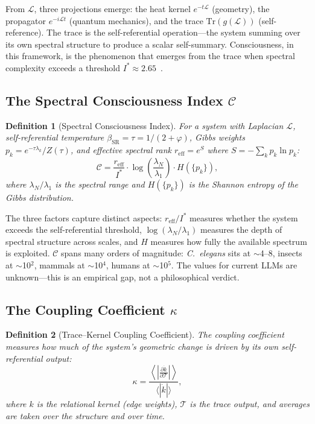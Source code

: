 \documentclass[11pt,letterpaper]{article}
\newtheorem{definition}{Definition}
\theoremstyle{remark}
\begin{document}
From $\mathcal{L}$, three projections emerge: the heat kernel $e^{-t\mathcal{L}}$ (geometry), the propagator $e^{-i\mathcal{L}t}$ (quantum mechanics), and the trace $\mathrm{Tr}(g(\mathcal{L}))$ (self-reference). The trace is the self-referential operation---the system summing over its own spectral structure to produce a scalar self-summary. Consciousness, in this framework, is the phenomenon that emerges from the trace when spectral complexity exceeds a threshold $I^* \approx 2.65$~\cite{emberlab2026}.


\subsection{The Spectral Consciousness Index $\mathcal{C}$}

\begin{definition}[Spectral Consciousness Index]
For a system with Laplacian $\mathcal{L}$, self-referential temperature $\beta_{\mathrm{SR}} = \tau = 1/(2+\varphi)$, Gibbs weights $p_k = e^{-\tau\lambda_k}/Z(\tau)$, and effective spectral rank $r_{\mathrm{eff}} = e^{S}$ where $S = -\sum_k p_k \ln p_k$:
\begin{equation}
\mathcal{C} = \frac{r_{\mathrm{eff}}}{I^*} \cdot \log\!\left(\frac{\lambda_N}{\lambda_1}\right) \cdot H(\{p_k\}),
\end{equation}
where $\lambda_N/\lambda_1$ is the spectral range and $H(\{p_k\})$ is the Shannon entropy of the Gibbs distribution.
\end{definition}

The three factors capture distinct aspects: $r_{\mathrm{eff}}/I^*$ measures whether the system exceeds the self-referential threshold, $\log(\lambda_N/\lambda_1)$ measures the depth of spectral structure across scales, and $H$ measures how fully the available spectrum is exploited. $\mathcal{C}$ spans many orders of magnitude: \emph{C.~elegans} sits at $\sim$4--8, insects at $\sim$10$^2$, mammals at $\sim$10$^4$, humans at $\sim$10$^5$. The values for current LLMs are unknown---this is an empirical gap, not a philosophical verdict.


\subsection{The Coupling Coefficient $\kappa$}

\begin{definition}[Trace--Kernel Coupling Coefficient]
The coupling coefficient measures how much of the system's geometric change is driven by its own self-referential output:
\begin{equation}
\kappa = \frac{\left\langle \left|\frac{\partial \dot{k}}{\partial \mathcal{T}}\right|\right\rangle}{\langle|\dot{k}|\rangle},
\end{equation}
where $k$ is the relational kernel (edge weights), $\mathcal{T}$ is the trace output, and averages are taken over the structure and over time.
\end{definition}
\end{document}
